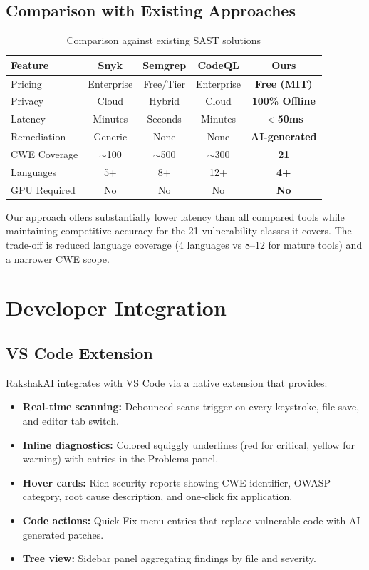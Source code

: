 \documentclass[conference,compsoc]{IEEEtran}
\begin{document}
\subsection{Comparison with Existing Approaches}

\begin{table}[h]
\centering
\caption{Comparison against existing SAST solutions}
\label{tab:comparison}
\small
\begin{tabular}{lcccc}
\toprule
\textbf{Feature} & \textbf{Snyk} & \textbf{Semgrep} & \textbf{CodeQL} & \textbf{Ours} \\
\midrule
Pricing & Enterprise & Free/Tier & Enterprise & \textbf{Free (MIT)} \\
Privacy & Cloud & Hybrid & Cloud & \textbf{100\% Offline} \\
Latency & Minutes & Seconds & Minutes & \textbf{$<$50ms} \\
Remediation & Generic & None & None & \textbf{AI-generated} \\
CWE Coverage & $\sim$100 & $\sim$500 & $\sim$300 & \textbf{21} \\
Languages & 5+ & 8+ & 12+ & \textbf{4+} \\
GPU Required & No & No & No & \textbf{No} \\
\bottomrule
\end{tabular}
\end{table}

Our approach offers substantially lower latency than all compared tools while maintaining competitive accuracy for the 21 vulnerability classes it covers. The trade-off is reduced language coverage (4 languages vs 8--12 for mature tools) and a narrower CWE scope.

\section{Developer Integration}
\label{sec:extension}

\subsection{VS Code Extension}

RakshakAI integrates with VS Code via a native extension that provides:

\begin{itemize}
    \item \textbf{Real-time scanning:} Debounced scans trigger on every keystroke, file save, and editor tab switch.
    \item \textbf{Inline diagnostics:} Colored squiggly underlines (red for critical, yellow for warning) with entries in the Problems panel.
    \item \textbf{Hover cards:} Rich security reports showing CWE identifier, OWASP category, root cause description, and one-click fix application.
    \item \textbf{Code actions:} Quick Fix menu entries that replace vulnerable code with AI-generated patches.
    \item \textbf{Tree view:} Sidebar panel aggregating findings by file and severity.
\end{itemize}
\end{document}
